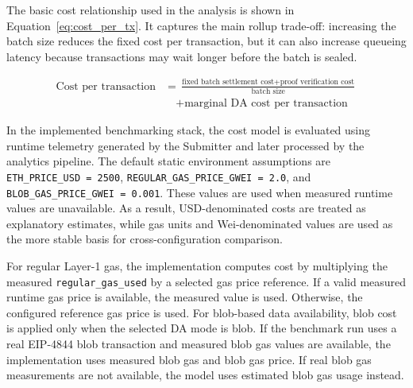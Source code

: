 The basic cost relationship used in the analysis is shown in Equation~\ref{eq:cost_per_tx}. It captures the main rollup trade-off: increasing the batch size reduces the fixed cost per transaction, but it can also increase queueing latency because transactions may wait longer before the batch is sealed.

\begin{equation}
\label{eq:cost_per_tx}
\begin{aligned}
\text{Cost per transaction}
&=
\frac{
\text{fixed batch settlement cost} + \text{proof verification cost}
}{
\text{batch size}
}
\\
&\quad + \text{marginal DA cost per transaction}
\end{aligned}
\end{equation}




In the implemented benchmarking stack, the cost model is evaluated using runtime telemetry generated by the Submitter and later processed by the analytics pipeline. The default static environment assumptions are \texttt{ETH\_PRICE\_USD = 2500}, \texttt{REGULAR\_GAS\_PRICE\_GWEI = 2.0}, and \texttt{BLOB\_GAS\_PRICE\_GWEI = 0.001}. These values are used when measured runtime values are unavailable. As a result, USD-denominated costs are treated as explanatory estimates, while gas units and Wei-denominated values are used as the more stable basis for cross-configuration comparison.

For regular Layer-1 gas, the implementation computes cost by multiplying the measured \texttt{regular\_gas\_used} by a selected gas price reference. If a valid measured runtime gas price is available, the measured value is used. Otherwise, the configured reference gas price is used. For blob-based data availability, blob cost is applied only when the selected DA mode is blob. If the benchmark run uses a real EIP-4844 blob transaction and measured blob gas values are available, the implementation uses measured blob gas and blob gas price. If real blob gas measurements are not available, the model uses estimated blob gas usage instead.

